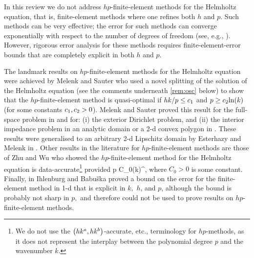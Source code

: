 In this review we do not address $hp$-finite-element methods for the Helmholtz equation, that is, finite-element methods where one refines both $h$ and $p$. Such methods can be very effective; the error for such methods can converge exponentially with respect to the number of degrees of freedom (see, e.g., \cite[Theorem 4.51]{Sc:98}). However, rigorous error analysis for these methods requires finite-element-error bounds that are completely explicit in both $h$ and $p$.

The landmark results on $hp$-finite-element methods for the Helmholtz equation were achieved by Melenk and Sauter \cite{MeSa:10,MeSa:11} who used a novel splitting of the solution of the Helmholtz equation (see the comments underneath \cref{rem:osc} below) to show that the $hp$-finite-element method is quasi-optimal if $hk/p \leq c_{1}$ and $p \geq \ct \ln k$ (for some constants $c_{1},c_{2}>0$). Melenk and Sauter proved this result for the full-space problem in \cite{MeSa:10} and for: (i) the exterior Dirichlet problem, and (ii) the interior impedance problem in an analytic domain or a 2-d convex polygon in \cite{MeSa:11}. These results were generalised to an arbitrary 2-d Lipschitz domain by Esterhazy and Melenk in \cite[Theorem 4.2]{EsMe:12}. Other results in the literature for $hp$-finite-element methods are those of Zhu and Wu \cite[Equation (1.7)]{ZhWu:13} who showed the $hp$-finite-element method for the Helmholtz equation is data-accurate\footnote{We do not use the $\hk{a}b$-accurate, etc., terminology for $hp$-methods, as it does not represent the interplay between the polynomial degree $p$ and the wavenumber $k$.} provided
\beqs
{}p \leq C_0\mleft(k\mright)^{},
\eeqs
where $C_0>0$ is some constant. Finally, in \cite[Corollary 3.2]{IhBa:97} Ihlenburg and Babu\v{s}ka proved a bound on the error for the finite-element method in 1-d that is explicit in $k,$ $h$, and $p$, although the bound is probably not sharp in $p,$ and therefore could not be used to prove results on $hp$-finite-element methods.

